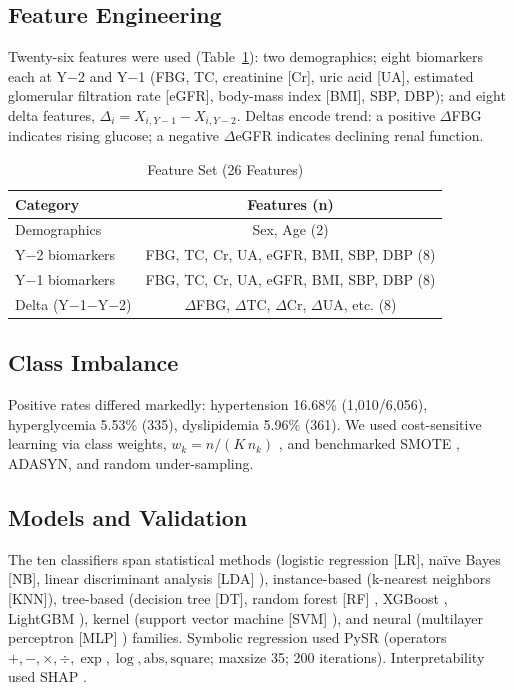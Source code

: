 \documentclass[journal]{IEEEtran}
\begin{document}
\subsection{Feature Engineering}
Twenty-six features were used (Table~\ref{tab:feat}): two demographics; eight biomarkers each at Y$-$2 and Y$-$1 (FBG, TC, creatinine [Cr], uric acid [UA], estimated glomerular filtration rate [eGFR], body-mass index [BMI], SBP, DBP); and eight delta features, $\Delta_i = X_{i,Y-1} - X_{i,Y-2}$. Deltas encode trend: a positive $\Delta$FBG indicates rising glucose; a negative $\Delta$eGFR indicates declining renal function.

\begin{table}[!t]
\caption{Feature Set (26 Features)}
\label{tab:feat}
\centering
\begin{tabular}{@{}lc@{}}
\toprule
Category & Features (n) \\
\midrule
Demographics & Sex, Age (2) \\
Y$-$2 biomarkers & FBG, TC, Cr, UA, eGFR, BMI, SBP, DBP (8) \\
Y$-$1 biomarkers & FBG, TC, Cr, UA, eGFR, BMI, SBP, DBP (8) \\
Delta (Y$-$1$-$Y$-$2) & $\Delta$FBG, $\Delta$TC, $\Delta$Cr, $\Delta$UA, etc. (8) \\
\bottomrule
\end{tabular}
\end{table}

\subsection{Class Imbalance}
Positive rates differed markedly: hypertension 16.68\% (1,010/6,056), hyperglycemia 5.53\% (335), dyslipidemia 5.96\% (361). We used cost-sensitive learning via class weights, $w_k = n/(K\,n_k)$ \cite{ref33}, and benchmarked SMOTE \cite{ref34}, ADASYN, and random under-sampling.

\subsection{Models and Validation}
The ten classifiers span statistical methods (logistic regression [LR], na\"ive Bayes [NB], linear discriminant analysis [LDA] \cite{ref25}), instance-based (k-nearest neighbors [KNN]), tree-based (decision tree [DT], random forest [RF] \cite{ref26}, XGBoost \cite{ref27}, LightGBM \cite{ref28}), kernel (support vector machine [SVM] \cite{ref29}), and neural (multilayer perceptron [MLP] \cite{ref30}) families. Symbolic regression used PySR \cite{ref31} (operators $+,-,\times,\div,\exp,\log,\mathrm{abs},\mathrm{square}$; maxsize 35; 200 iterations). Interpretability used SHAP \cite{ref32}.
\end{document}
